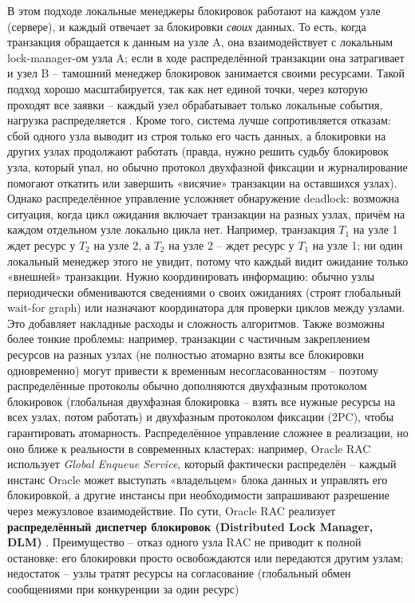 \begin{itemize}
    В этом подходе локальные менеджеры блокировок работают на каждом узле (сервере), и каждый отвечает за блокировки \textit{своих} данных. То есть, когда транзакция обращается к данным на узле A, она взаимодействует с локальным lock-manager-ом узла A; если в ходе распределённой транзакции она затрагивает и узел B – тамошний менеджер блокировок занимается своими ресурсами. Такой подход хорошо масштабируется, так как нет единой точки, через которую проходят все заявки – каждый узел обрабатывает только локальные события, нагрузка распределяется \autocite{Silberschatz}. Кроме того, система лучше сопротивляется отказам: сбой одного узла выводит из строя только его часть данных, а блокировки на других узлах продолжают работать (правда, нужно решить судьбу блокировок узла, который упал, но обычно протокол двухфазной фиксации и журналирование помогают откатить или завершить «висячие» транзакции на оставшихся узлах). Однако распределённое управление усложняет обнаружение deadlock: возможна ситуация, когда цикл ожидания включает транзакции на разных узлах, причём на каждом отдельном узле локально цикла нет. Например, транзакция $T_1$ на узле 1 ждет ресурс у $T_2$ на узле 2, а $T_2$ на узле 2 – ждет ресурс у $T_1$ на узле 1; ни один локальный менеджер этого не увидит, потому что каждый видит ожидание только «внешней» транзакции. Нужно координировать информацию: обычно узлы периодически обмениваются сведениями о своих ожиданиях (строят глобальный wait-for graph) или назначают координатора для проверки циклов между узлами. Это добавляет накладные расходы и сложность алгоритмов. Также возможны более тонкие проблемы: например, транзакции с частичным закреплением ресурсов на разных узлах (не полностью атомарно взяты все блокировки одновременно) могут привести к временным несогласованностям – поэтому распределённые протоколы обычно дополняются двухфазным протоколом блокировок (глобальная двухфазная блокировка – взять все нужные ресурсы на всех узлах, потом работать) и двухфазным протоколом фиксации (2PC), чтобы гарантировать атомарность. Распределённое управление сложнее в реализации, но оно ближе к реальности в современных кластерах: например, Oracle RAC использует \textit{Global Enqueue Service}, который фактически распределён – каждый инстанс Oracle может выступать «владельцем» блока данных и управлять его блокировкой, а другие инстансы при необходимости запрашивают разрешение через межузловое взаимодействие. По сути, Oracle RAC реализует \textbf{распределённый диспетчер блокировок (Distributed Lock Manager, DLM)} \autocite{oracleessentialsc7}. Преимущество – отказ одного узла RAC не приводит к полной остановке: его блокировки просто освобождаются или передаются другим узлам; недостаток – узлы тратят ресурсы на согласование (глобальный обмен сообщениями при конкуренции за один ресурс)
 \end{itemize} 
 
